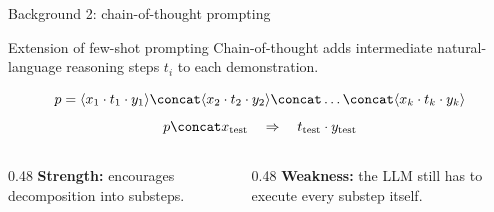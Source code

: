 \begin{frame}{Background 2: chain-of-thought prompting}
\begin{block}{Extension of few-shot prompting}
Chain-of-thought adds intermediate natural-language reasoning steps $t_i$ to each demonstration.
\end{block}
\[
  p = \langle x_1 \cdot t_1 \cdot y_1 \rangle \concat \langle x_2 \cdot t_2 \cdot y_2 \rangle \concat \dots \concat \langle x_k \cdot t_k \cdot y_k \rangle
\]
\[
  p \concat x_{\text{test}} \quad \Rightarrow \quad t_{\text{test}} \cdot y_{\text{test}}
\]
\vspace{0.15cm}
\begin{columns}[T,totalwidth=\textwidth]
\begin{column}{0.48\textwidth}
\textbf{Strength:} encourages decomposition into substeps.
\end{column}
\begin{column}{0.48\textwidth}
\textbf{Weakness:} the LLM still has to execute every substep itself.
\end{column}
\end{columns}
\end{frame}
